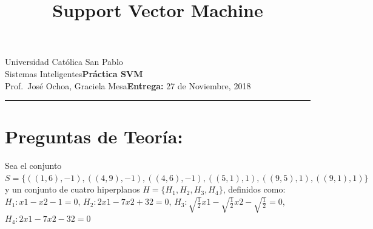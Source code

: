 \documentclass{article}
\title{Support Vector Machine}
\date{}
\newcommand{\assignment}{Práctica SVM}
\newcommand{\duedate}{27 de Noviembre, 2018}
\begin{document}
Universidad Católica San Pablo\hfill\\
Sistemas Inteligentes\hfill\textbf{\assignment}\\
Prof.\ José Ochoa, Graciela Mesa\hfill\textbf{Entrega:} \duedate\\
\smallskip\hrule\bigskip

{\let\newpage\relax\maketitle}

\section{Preguntas de Teoría:}
Sea el conjunto $S = \{((1, 6), -1), ((4, 9), -1),((4, 6), -1), ((5, 1), 1), ((9,5), 1), ((9,1), 1)\}$ y un conjunto de cuatro
hiperplanos $H = \{H_1, H_2, H_3, H_4\}$, definidos como: $H_1: x1 - x2 - 1 = 0$, $H_2: 2x1 - 7x2 +32 = 0$,
$H_3: \sqrt{\frac{1}{2}}x1 - \sqrt{\frac{1}{2}}x2 - \sqrt{\frac{1}{2}} = 0$, $H_4: 2x1 - 7x2  - 32 = 0$
\end{document}
